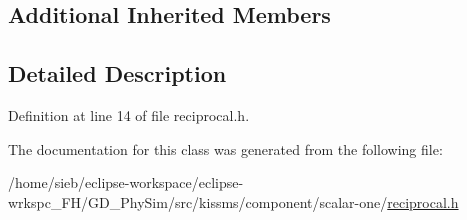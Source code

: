 \subsection*{Additional Inherited Members}


\subsection{Detailed Description}


Definition at line 14 of file reciprocal.\-h.



The documentation for this class was generated from the following file\-:\begin{DoxyCompactItemize}
\item 
/home/sieb/eclipse-\/workspace/eclipse-\/wrkspc\-\_\-\-F\-H/\-G\-D\-\_\-\-Phy\-Sim/src/kissms/component/scalar-\/one/\hyperlink{reciprocal_8h}{reciprocal.\-h}\end{DoxyCompactItemize}
